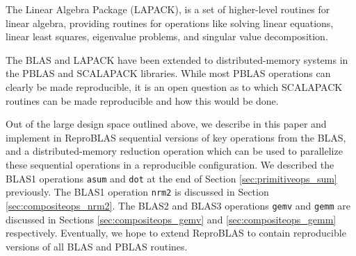   The Linear Algebra Package (LAPACK), is a set of higher-level
  routines for linear algebra, providing routines for operations like solving linear equations, linear least squares, eigenvalue problems, and singular value decomposition.

  The BLAS and LAPACK have been extended to distributed-memory systems in the PBLAS and SCALAPACK libraries. While most PBLAS operations can clearly be made reproducible, it is an open question as to which SCALAPACK routines can be made reproducible and how this would be done. 

  Out of the large design space outlined above, we describe in this paper and implement in ReproBLAS sequential versions of key operations from the BLAS, and a distributed-memory reduction operation which can be used to parallelize these sequential operations in a reproducible configuration. We described the BLAS1 operations \texttt{asum} and \texttt{dot} at the end of Section \ref{sec:primitiveops_sum} previously. The BLAS1 operation \texttt{nrm2} is discussed in Section \ref{sec:compositeops_nrm2}. The BLAS2 and BLAS3 operations \texttt{gemv} and \texttt{gemm} are discussed in Sections \ref{sec:compositeops_gemv} and \ref{sec:compositeops_gemm} respectively. Eventually, we hope to extend ReproBLAS to contain reproducible versions of all BLAS and PBLAS routines.

    
    
    
    
